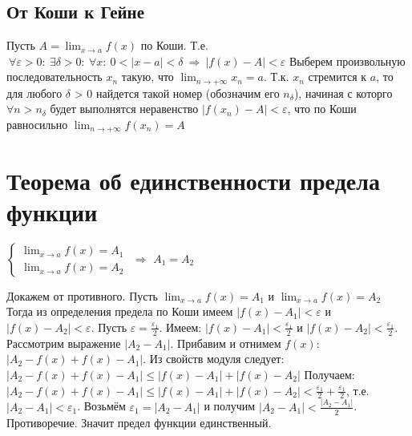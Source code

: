 \subsection{От Коши к Гейне}
Пусть $\displaystyle A = \lim_{x \to a} f(x)$ по Коши. Т.е.\newline
$\displaystyle\ \forall \varepsilon > 0 : \ \exists \delta > 0: \ \forall x : \ 0 < |x - a| < \delta 
\ \Rightarrow \ |f(x) - A| < \varepsilon $\newline
Выберем произвольную последовательность  $x_n$  такую, что  $\displaystyle \lim_{n \to +\infty} x_n 
= a$. Т.к. $x_n$ стремится к $a$, то для любого $\delta$ > 0 найдется такой номер (обозначим его 
$n_\delta$), начиная с которго $\forall n>n_\delta$ будет выполнятся неравенство $|f(x_n) - 
A|<\varepsilon$, что по Коши равносильно $\displaystyle \lim_{n \to +\infty} f(x_n) = A$

\section[Т. об един. предела функции]{Теорема об единственности предела функции}
\begin{theorem}
$\begin{cases}\displaystyle \lim_{x \to a} f(x) = A_1 \\ \displaystyle \lim_{x \to a} f(x) = 
A_2\end{cases}$
$\Longrightarrow$ \qquad $\displaystyle A_1 = A_2$
\end{theorem}
Докажем от противного. Пусть $\displaystyle \lim_{x \to a} f(x) = A_1$ и $\displaystyle \lim_{x \to 
a} f(x) = A_2$\newline
Тогда из определения предела по Коши имеем $|f(x) - A_1| < \varepsilon$ и $|f(x) - A_2| < 
\varepsilon$.\newline 
Пусть $\varepsilon = \frac{\varepsilon_1}{2}$. Имеем:
$|f(x) - A_1| < \frac{\varepsilon_1}{2}$ и $|f(x) - A_2| < \frac{\varepsilon_1}{2}$.\newline
Рассмотрим выражение $|A_2 - A_1|$. Прибавим и отнимем $f(x)$: $|A_2 - f(x) + f(x) - A_1|$. Из 
свойств модуля следует:
$|A_2 - f(x) + f(x) - A_1| \leq |f(x) - A_1| + |f(x) - A_2|$\newline
Получаем: $|A_2 - f(x) + f(x) - A_1| \leq |f(x) - A_1| + |f(x) - A_2| < \frac{\varepsilon_1}{2} + 
\frac{\varepsilon_1}{2}$, т.е. $|A_2 - A_1| < \varepsilon_1$.
Возьмём $\varepsilon_1 = |A_2 - A_1|$ и получим $|A_2 - A_1| < \frac{|A_2 - A_1|}{2}$. Противоречие. 
Значит предел функции единственный.
